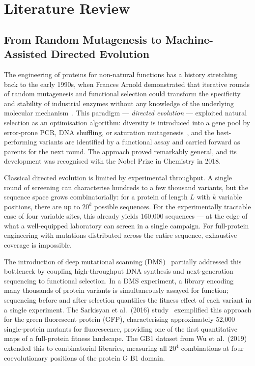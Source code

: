 \documentclass[english, 12pt, a4paper, elec, utf8, a-2b, online]{aaltothesis}
\begin{document}
\clearpage

\section{Literature Review}
\label{sec:litrev}

\subsection{From Random Mutagenesis to Machine-Assisted Directed Evolution}
\label{sec:litrev:history}

The engineering of proteins for non-natural functions has a history stretching back to the
early 1990s, when Frances Arnold demonstrated that iterative rounds of random mutagenesis and
functional selection could transform the specificity and stability of industrial enzymes
without any knowledge of the underlying molecular mechanism~\cite{Romero2009}.
This paradigm --- \emph{directed evolution} --- exploited natural selection as an optimisation
algorithm: diversity is introduced into a gene pool by error-prone PCR, DNA shuffling, or
saturation mutagenesis~\cite{Stemmer1994}, and the best-performing variants are identified
by a functional assay and carried forward as parents for the next round.
The approach proved remarkably general, and its development was recognised with the Nobel Prize
in Chemistry in 2018.

Classical directed evolution is limited by experimental throughput.
A single round of screening can characterise hundreds to a few thousand variants, but the
sequence space grows combinatorially: for a protein of length $L$ with $k$ variable positions,
there are up to $20^k$ possible sequences.
For the experimentally tractable case of four variable sites, this already yields 160,000
sequences --- at the edge of what a well-equipped laboratory can screen in a single campaign.
For full-protein engineering with mutations distributed across the entire sequence, exhaustive
coverage is impossible.

The introduction of deep mutational scanning (DMS)~\cite{Fowler2014} partially addressed
this bottleneck by coupling high-throughput DNA synthesis and next-generation sequencing to
functional selection.
In a DMS experiment, a library encoding many thousands of protein variants is simultaneously
assayed for function; sequencing before and after selection quantifies the fitness effect of
each variant in a single experiment.
The Sarkisyan et al.\ (2016) study~\cite{Sarkisyan2016} exemplified this approach for the
green fluorescent protein (GFP), characterising approximately 52,000 single-protein mutants
for fluorescence, providing one of the first quantitative maps of a full-protein fitness landscape.
The GB1 dataset from Wu et al.\ (2019)~\cite{Wu2019} extended this to combinatorial libraries,
measuring all $20^4$ combinations at four coevolutionary positions of the protein G B1 domain.
\end{document}

